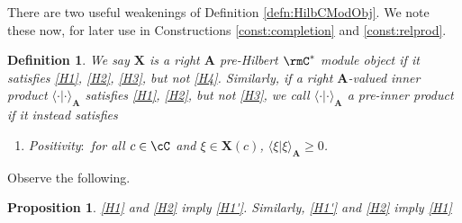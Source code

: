\documentclass[11pt,reqno]{amsart}
\newcommand{\bb}[1]{\mathbf{#1}}
\numberwithin{equation}{section}
\theoremstyle{plain}
\newtheorem{defn}[thm]{Definition}
\newtheorem{prop}[thm]{Proposition}
\begin{document}
There are two useful weakenings of Definition \ref{defn:HilbCModObj}.
We note these now, for later use in Constructions \ref{const:completion} and \ref{const:relprod}.
\begin{defn}
We say $\bb X$ is a right $\bb A$ pre-Hilbert $\rmC^*$ module object if it satisfies \ref{H1}, \ref{H2}, \ref{H3}, but not \ref{H4}.
Similarly, if a right $\bb A$-valued inner product $\langle \cdot | \cdot \rangle_{\bb A}$ satisfies \ref{H1}, \ref{H2}, but not \ref{H3}, we call $\langle \cdot | \cdot \rangle_{\bb A}$ a pre-inner product if it instead satisfies
\begin{enumerate}
\item [(H3')] \label{H3'} Positivity$\colon$ for all $c \in \cC$ and $\xi \in \bb X(c)$, $\langle \xi | \xi \rangle_{\bb A} \geq 0$.
\end{enumerate}
\end{defn}

Observe the following.
\begin{prop} \label{prop:RightLeftSwap}
\ref{H1} and \ref{H2} imply \ref{H1'}.
Similarly, \ref{H1'} and \ref{H2} imply \ref{H1}
\end{prop}
\end{document}
